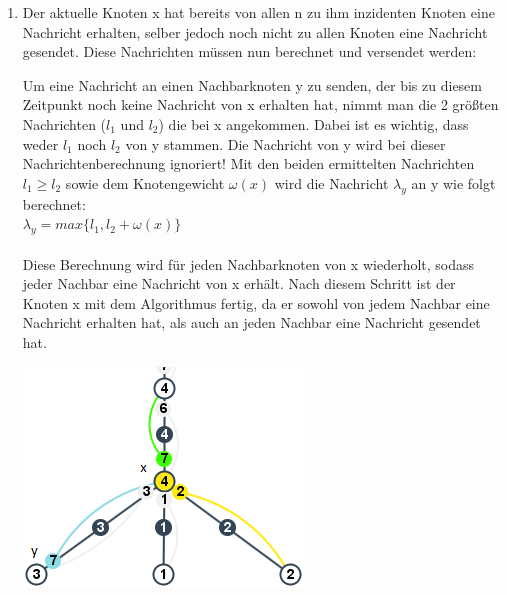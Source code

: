 \begin{enumerate}
\begin{enumerate}
				
			\item Der aktuelle Knoten x hat bereits von allen n zu ihm inzidenten Knoten eine Nachricht erhalten, selber jedoch noch nicht zu allen Knoten eine Nachricht gesendet. Diese Nachrichten müssen nun berechnet und versendet werden:\label{labelAufUnterfall}
			\\
				
				\begin{minipage}{0.50\textwidth} 
					
					Um eine Nachricht an einen Nachbarknoten y zu senden, der bis zu diesem Zeitpunkt noch keine Nachricht von x erhalten hat, nimmt man die 2 größten Nachrichten ($l_{1}$ und $l_{2}$) die bei x angekommen. Dabei ist es wichtig, dass weder $l_{1}$ noch $l_{2}$ von y stammen. Die Nachricht von y wird bei dieser Nachrichtenberechnung ignoriert! Mit den beiden ermittelten Nachrichten $l_{1} \ge l_{2}$ sowie dem Knotengewicht $\omega(x)$ wird die Nachricht $\lambda_{y}$ an y wie folgt berechnet:\\
					$\lambda_{y} = max\{l_{1},  l_{2} + \omega(x)\}$
					\\
					\\
					Diese Berechnung wird für jeden Nachbarknoten von x wiederholt, sodass jeder Nachbar eine Nachricht von x erhält. Nach diesem Schritt ist der Knoten x mit dem Algorithmus fertig, da er sowohl von jedem Nachbar eine Nachricht erhalten hat, als auch an jeden Nachbar eine Nachricht gesendet hat.
				\end{minipage}
				\hfill
				\begin{minipage}{0.35\textwidth}
					
					\includegraphics[width=\textwidth]{bilder/abb_paper_nknoten.png}
				\end{minipage}
			

\end{enumerate}
\end{enumerate}

